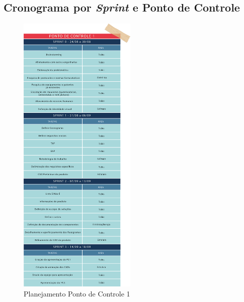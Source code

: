 \begin{apendicesenv}
\chapter{Cronograma por \textit{Sprint} e Ponto de Controle}\label{roadmap}

\vspace{-1.6cm}
\begin{figure}[H]
    \centering
    \includegraphics[width=0.5\textwidth]{figuras/sprint-pc1.png}
    \caption{Planejamento Ponto de Controle 1}
    \label{fig:Sprint_pc1}
\end{figure}


\end{apendicesenv}
